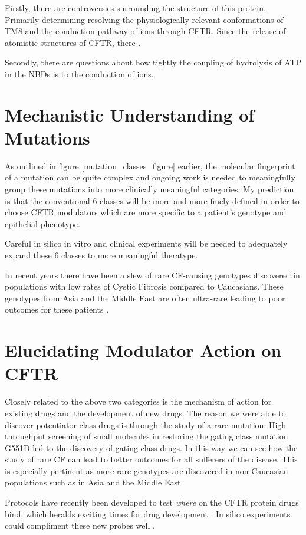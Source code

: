 Firstly, there are controversies surrounding the structure of this protein. Primarily determining resolving the physiologically relevant conformations of TM8 and the conduction pathway of ions through CFTR. Since the release of atomistic structures of CFTR, there .

Secondly, there are questions about how tightly the coupling of hydrolysis of ATP in the NBDs is to the conduction of ions.

\section{Mechanistic Understanding of Mutations}
As outlined in figure \ref{mutation_classes_figure} earlier, the molecular fingerprint of a mutation can be quite complex and ongoing work is needed to meaningfully group these mutations into more clinically meaningful categories. My prediction is that the conventional 6 classes will be more and more finely defined in order to choose CFTR modulators which are more specific to a patient's genotype and epithelial phenotype. 

Careful in silico in vitro and clinical experiments will be needed to adequately expand these 6 classes to more meaningful theratype.

In recent years there have been a slew of rare CF-causing genotypes discovered in populations with low rates of Cystic Fibrosis compared to Caucasians. These genotypes from Asia and the Middle East are often ultra-rare leading to poor outcomes for these patients \cite{}. 

\section{Elucidating Modulator Action on CFTR}
Closely related to the above two categories is the mechanism of action for existing drugs and the development of new drugs. The reason we were able to discover potentiator class drugs is through the study of a rare mutation. High throughput screening of small molecules in restoring the gating class mutation G551D led to the discovery of gating class drugs. In this way we can see how the study of rare CF can lead to better outcomes for all sufferers of the disease. This is especially pertinent as more rare genotypes are discovered in non-Caucasian populations such as in Asia and the Middle East.  

Protocols have recently been developed to test \textit{where} on the CFTR protein drugs bind, which heralds exciting times for drug development \cite{laselva2022}. In silico experiments could compliment these new probes well \cite{}.

